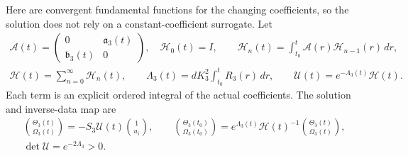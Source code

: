 Here are convergent fundamental functions for the changing coefficients,
so the solution does not rely on a constant-coefficient surrogate.
Let
\begin{equation}\label{cvlane:tg:fundamental}
 \begin{gathered}
 \mathcal A(t)=\begin{pmatrix}0&\mathfrak a_3(t)\\
                              \mathfrak b_3(t)&0\end{pmatrix},\quad
 \mathcal H_0(t)=I,\qquad
 \mathcal H_n(t)=\int_{t_0}^t\mathcal A(r)\mathcal H_{n-1}(r)\,dr,\\
 \mathcal H(t)=\sum_{n=0}^\infty\mathcal H_n(t),\qquad
 \Lambda_3(t)=dK_3^2\int_{t_0}^tR_3(r)\,dr,\qquad
 \mathcal U(t)=e^{-\Lambda_3(t)}\mathcal H(t).
 \end{gathered}
\end{equation}
Each term is an explicit ordered integral of the actual coefficients.
The solution and inverse-data map are
\begin{equation}\label{cvlane:tg:fundamental_inverse}
\begin{gathered}
 \binom{\Theta_3(t)}{\Omega_3(t)}
       =-S_3\mathcal U(t)\binom1{u_i},\qquad
 \binom{\Theta_3(t_0)}{\Omega_3(t_0)}
       =e^{\Lambda_3(t)}\mathcal H(t)^{-1}
                         \binom{\Theta_3(t)}{\Omega_3(t)},\\
 \det\mathcal U=e^{-2\Lambda_3}>0.
\end{gathered}
\end{equation}

